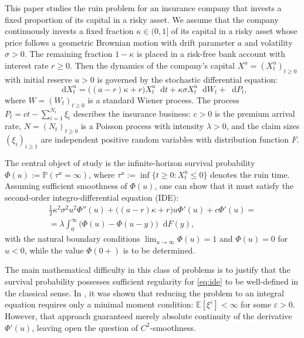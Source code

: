 \documentclass[smallextended]{svjour3}
\providecommand{\diff}{\mathop{}\!\mathrm{d}}
\newcommand{\bbp}{\mathbb{P}}
\newcommand{\bbe}{\mathbb{E}}
\newcommand{\eps}{\varepsilon}
\begin{document}
This paper studies the ruin problem for an insurance company that invests a fixed proportion of its capital in a risky asset. We assume that the company continuously invests a fixed fraction $\kappa \in (0,1]$ of its capital in a risky asset whose price follows a geometric Brownian motion with drift parameter $a$ and volatility $\sigma > 0$. The remaining fraction $1-\kappa$ is placed in a risk-free bank account with interest rate $r \ge 0$. Then the dynamics of the company's capital $X^u = (X^u_t)_{t \ge 0}$ with initial reserve $u>0$ is governed by the stochastic differential equation:
\begin{equation*}%
\diff X^u_t = \big( (a-r)\kappa + r \big) X^u_t \diff t + \kappa \sigma X^u_t \diff W_t + \diff P_t,
\end{equation*}
where $W = (W_t)_{t\ge 0}$ is a standard Wiener process. The process $P_t = ct - \sum_{i=1}^{N_t} \xi_i$ describes the insurance business: $c>0$ is the premium arrival rate, $N = (N_t)_{t\ge 0}$ is a Poisson process with intensity $\lambda>0$, and the claim sizes $(\xi_i)_{i \ge 1}$ are independent positive random variables with distribution function $F$.

The central object of study is the infinite-horizon survival probability $\Phi(u) := \bbp(\tau^u = \infty)$, where $\tau^u := \inf\{t \ge 0 : X^u_t \le 0\}$ denotes the ruin time. Assuming sufficient smoothness of $\Phi(u)$, one can show that it must satisfy the second-order integro-differential equation (IDE):
\begin{multline}
\label{eq:ide}
\frac{1}{2} \kappa^2 \sigma^2 u^2 \Phi''(u) + \big( (a-r)\kappa + r \big) u \Phi'(u) + c \Phi'(u) =
\\
= \lambda \int_0^\infty \big( \Phi(u) - \Phi(u-y) \big) \diff F(y),
\end{multline}
with the natural boundary conditions $\lim_{u\to\infty}\Phi(u) = 1$ and $\Phi(u)=0$ for $u<0$, while the value $\Phi(0+)$ is to be determined.

The main mathematical difficulty in this class of problems is to justify that the survival probability possesses sufficient regularity for \eqref{eq:ide} to be well-defined in the classical sense. In \cite{Grandits2004}, it was shown that reducing the problem to an integral equation requires only a minimal moment condition: $\bbe[\xi^\eps] < \infty$ for some $\eps > 0$. However, that approach guaranteed merely absolute continuity of the derivative $\Phi'(u)$, leaving open the question of $C^2$-smoothness.
\end{document}
